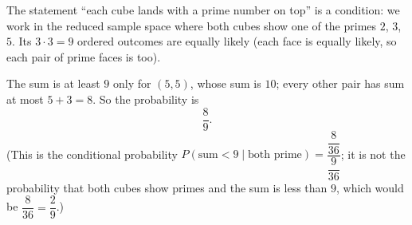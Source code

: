 The statement ``each cube lands with a prime number on top'' is a condition: we work in the reduced sample space where both cubes show one of the primes $2$, $3$, $5$. Its $3\cdot3=9$ ordered outcomes are equally likely (each face is equally likely, so each pair of prime faces is too).

The sum is at least $9$ only for $(5,5)$, whose sum is $10$; every other pair has sum at most $5+3=8$. So the probability is
\[
\boxed{\dfrac{8}{9}}.
\]
(This is the conditional probability $P(\text{sum}<9\mid\text{both prime})=\dfrac{\dfrac{8}{36}}{\dfrac{9}{36}}$; it is not the probability that both cubes show primes and the sum is less than $9$, which would be $\dfrac{8}{36}=\dfrac{2}{9}$.)
